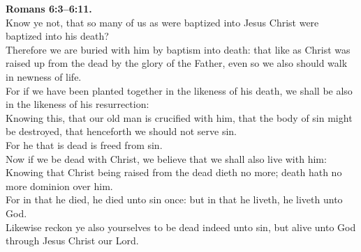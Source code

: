 \documentclass[10pt]{article} %
\begin{document}
{\begin{minipage}[t]{0.45\textwidth}
\textbf{Romans 6:3--6:11.}\\
Know ye not, that so many of us as were baptized into Jesus Christ were baptized into his death?\\
Therefore we are buried with him by baptism into death: that like as Christ was raised up from the dead by the glory of the Father, even so we also should walk in newness of life.\\
For if we have been planted together in the likeness of his death, we shall be also in the likeness of his resurrection:\\
Knowing this, that our old man is crucified with him, that the body of sin might be destroyed, that henceforth we should not serve sin.\\
For he that is dead is freed from sin.\\
Now if we be dead with Christ, we believe that we shall also live with him:\\
Knowing that Christ being raised from the dead dieth no more; death hath no more dominion over him.\\
For in that he died, he died unto sin once: but in that he liveth, he liveth unto God.\\
Likewise reckon ye also yourselves to be dead indeed unto sin, but alive unto God through Jesus Christ our Lord.\\

\end{minipage}}
\vspace*{\fill}
\newpage
\Huge%
\vspace*{\fill}
\begin{spacing}{1.3}%
\end{spacing}
\vspace*{\fill}
\end{document}
